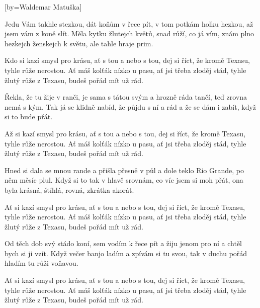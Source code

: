 [by={Waldemar Matuška}]

\beginverse{}
Jedu Vám takhle stezkou, dát koňům v řece pít,
v tom potkám holku hezkou, až jsem vám z koně slít.
Měla kytku žlutejch květů, snad růží, co já vím,
znám plno hezkejch ženskejch k světu, ale tahle hraje prim.
\endverse{}

\beginchorus{}
Kdo si kazí smysl pro krásu, ať s tou a nebo s tou,
dej si říct, že kromě Texasu, tyhle růže nerostou.
Ať máš kolťák nízko u pasu, ať jsi třeba zloděj stád,
tyhle žlutý růže z Texasu, budeš pořád mít už rád.
\endchorus{}

\beginverse{}
Řekla, že tu žije v ranči, je sama s tátou svým
a hrozně ráda tančí, teď zrovna nemá s kým.
Tak já se klidně nabíd, že půjdu s ní a rád
a že se dám i zabít, když si to bude přát.
\endverse{}

\beginchorus{}
Až si kazí smysl pro krásu, ať s tou a nebo s tou,
dej si říct, že kromě Texasu, tyhle růže nerostou.
Ať máš kolťák nízko u pasu, ať jsi třeba zloděj stád,
tyhle žlutý růže z Texasu, budeš pořád mít už rád.
\endchorus{}

\beginverse{}
Hned si dala se mnou rande a přišla přesně v půl
a dole teklo Rio Grande, po něm měsíc plul.
Když si to tak v hlavě srovnám, co víc jsem si moh přát,
ona byla krásná, štíhlá, rovná, zkrátka akorát.
\endverse{}

\beginchorus{}
Ať si kazí smysl pro krásu, ať s tou a nebo s tou,
dej si říct, že kromě Texasu, tyhle růže nerostou.
Ať máš kolťák nízko u pasu, ať jsi třeba zloděj stád,
tyhle žlutý růže z Texasu, budeš pořád mít už rád.
\endchorus{}

\beginverse{}
Od těch dob svý stádo koní, sem vodím k řece pít
a žiju jenom pro ní a chtěl bych si ji vzít.
Když večer banjo ladím a zpívám si tu svou,
tak v duchu pořád hladím tu růži voňavou.
\endverse{}

\beginchorus{}
Ať si kazí smysl pro krásu, ať s tou a nebo s tou,
dej si říct, že kromě Texasu, tyhle růže nerostou.
Ať máš kolťák nízko u pasu, ať jsi třeba zloděj stád,
tyhle žlutý růže z Texasu, budeš pořád mít už rád.
\endchorus{}

\endsong{}
